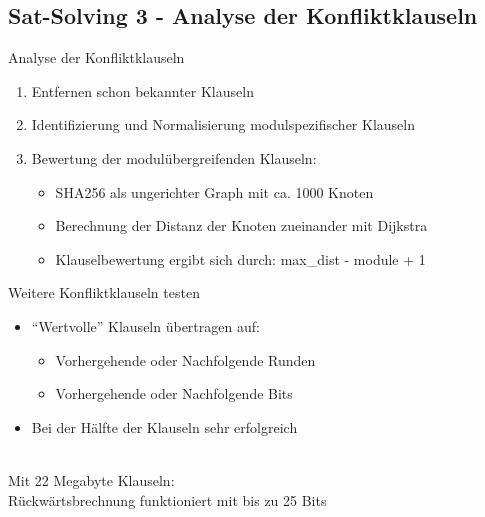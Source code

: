 \documentclass{beamer}
\begin{document}
  \subsection{Sat-Solving 3 - Analyse der Konfliktklauseln}
    \begin{frame}{Analyse der Konfliktklauseln}
      \begin{enumerate}
        \setlength{\itemsep}{20pt}
        \item Entfernen schon bekannter Klauseln
        \item Identifizierung und Normalisierung modulspezifischer Klauseln
        \pause
        \item Bewertung der modulübergreifenden Klauseln:
        \begin{itemize}
          \item SHA256 als ungerichter Graph mit ca. 1000 Knoten
          \item Berechnung der Distanz der Knoten zueinander mit Dijkstra
          \item Klauselbewertung ergibt sich durch: max\_dist - module + 1
        \end{itemize}
      \end{enumerate}
    \end{frame}
    \begin{frame}{Weitere Konfliktklauseln testen}
      \begin{itemize}
        \setlength{\itemsep}{20pt}
        \item "`Wertvolle"' Klauseln übertragen auf:
        \begin{itemize}
          \item Vorhergehende oder Nachfolgende Runden
          \item Vorhergehende oder Nachfolgende Bits
        \end{itemize}
        \item Bei der Hälfte der Klauseln sehr erfolgreich
      \end{itemize}
      \pause
      ~\\
      Mit 22 Megabyte Klauseln:\\
      Rückwärtsbrechnung funktioniert mit bis zu 25 Bits
    \end{frame}
\end{document}
